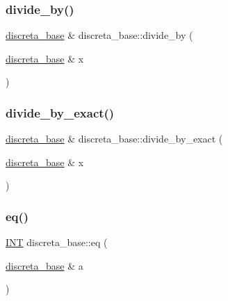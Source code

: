 \mbox{\label{classdiscreta__base_aa3f9d43fab5e6240202fbd7c1f5e3e74}} 
\subsubsection{\texorpdfstring{divide\+\_\+by()}{divide\_by()}}
{\footnotesize\ttfamily \mbox{\hyperlink{classdiscreta__base}{discreta\+\_\+base}} \& discreta\+\_\+base\+::divide\+\_\+by (\begin{DoxyParamCaption}\item[{\mbox{\hyperlink{classdiscreta__base}{discreta\+\_\+base}} \&}]{x }\end{DoxyParamCaption})}

\mbox{\label{classdiscreta__base_a14ea31dd075b20644457db08319389ef}} 
\subsubsection{\texorpdfstring{divide\+\_\+by\+\_\+exact()}{divide\_by\_exact()}}
{\footnotesize\ttfamily \mbox{\hyperlink{classdiscreta__base}{discreta\+\_\+base}} \& discreta\+\_\+base\+::divide\+\_\+by\+\_\+exact (\begin{DoxyParamCaption}\item[{\mbox{\hyperlink{classdiscreta__base}{discreta\+\_\+base}} \&}]{x }\end{DoxyParamCaption})}

\mbox{\label{classdiscreta__base_a7afe4f013b04efa764ed9fe099e5eb80}} 
\subsubsection{\texorpdfstring{eq()}{eq()}}
{\footnotesize\ttfamily \mbox{\hyperlink{galois_8h_a09fddde158a3a20bd2dcadb609de11dc}{I\+NT}} discreta\+\_\+base\+::eq (\begin{DoxyParamCaption}\item[{\mbox{\hyperlink{classdiscreta__base}{discreta\+\_\+base}} \&}]{a }\end{DoxyParamCaption})}

